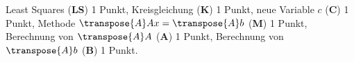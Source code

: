 \begin{bewertung}
Least Squares ({\bf LS}) 1 Punkt,
Kreisgleichung ({\bf K}) 1 Punkt,
neue Variable $c$ ({\bf C}) 1 Punkt,
Methode $\transpose{A}Ax=\transpose{A}b$ ({\bf M}) 1 Punkt,
Berechnung von $\transpose{A}A$ ({\bf A}) 1 Punkt,
Berechnung von $\transpose{A}b$ ({\bf B}) 1 Punkt.
\end{bewertung}
